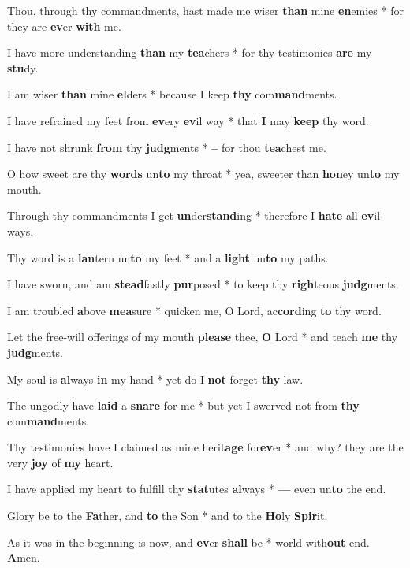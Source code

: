 \begin{multicols}{2}
	Thou, through thy commandments, hast made me wiser \textbf{than} mine \textbf{en}emies * for they are \textbf{ev}er \textbf{with} me.
	
	I have more understanding \textbf{than} my \textbf{tea}chers * for thy testimonies \textbf{are} my \textbf{stu}dy.
	
	I am wiser \textbf{than} mine \textbf{el}ders * because I keep \textbf{thy} com\textbf{mand}ments.
	
	I have refrained my feet from \textbf{ev}ery \textbf{ev}il way * that \textbf{I} may \textbf{keep} thy word.
	
	I have not shrunk \textbf{from} thy \textbf{judg}ments * \textbf{--} for thou \textbf{tea}chest me.
	
	O how sweet are thy \textbf{words} un\textbf{to} my throat * yea, sweeter than \textbf{hon}ey un\textbf{to} my mouth.
	
	Through thy commandments I get \textbf{un}der\textbf{stand}ing * therefore I \textbf{hate} all \textbf{ev}il ways.
	
	Thy word is a \textbf{lan}tern un\textbf{to} my feet * and a \textbf{light} un\textbf{to} my paths.
	
	I have sworn, and am \textbf{stead}fastly \textbf{pur}posed * to keep thy \textbf{righ}teous \textbf{judg}ments.
	
	I am troubled \textbf{a}bove \textbf{mea}sure * quicken me, O Lord, ac\textbf{cord}ing \textbf{to} thy word.
	
	Let the free-will offerings of my mouth \textbf{please} thee, \textbf{O} Lord * and teach \textbf{me} thy \textbf{judg}ments.
	
	My soul is \textbf{al}ways \textbf{in} my hand * yet do I \textbf{not} forget \textbf{thy} law.
	
	The ungodly have \textbf{laid} a \textbf{snare} for me * but yet I swerved not from \textbf{thy} com\textbf{mand}ments.
	
	Thy testimonies have I claimed as mine herit\textbf{age} for\textbf{ev}er * and why? they are the very \textbf{joy} of \textbf{my} heart.
	
	I have applied my heart to fulfill thy \textbf{stat}utes \textbf{al}ways * \textbf{---} even un\textbf{to} the end.
	
	Glory be to the \textbf{Fa}ther, and \textbf{to} the Son * and to the \textbf{Ho}ly \textbf{Spir}it.
	
	As it was in the beginning is now, and \textbf{ev}er \textbf{shall} be * world with\textbf{out} end. \textbf{A}men.
\end{multicols}